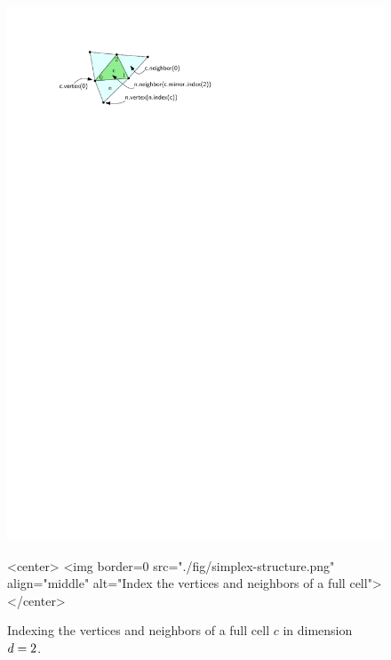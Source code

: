\begin{figure}[htbp]
\begin{ccTexOnly}
\begin{center}
\includegraphics{Triangulation/fig/simplex-structure.pdf}
\end{center}
\end{ccTexOnly}
\begin{ccHtmlOnly}
<center>
<img border=0 src="./fig/simplex-structure.png" align="middle"
alt="Index the vertices and neighbors of a full cell">
</center>
\end{ccHtmlOnly}
\caption{Indexing the vertices and neighbors of a full cell $c$ in
  dimension $d=2$.}
\label{triangulation:fig:full-cell}
\end{figure} 

